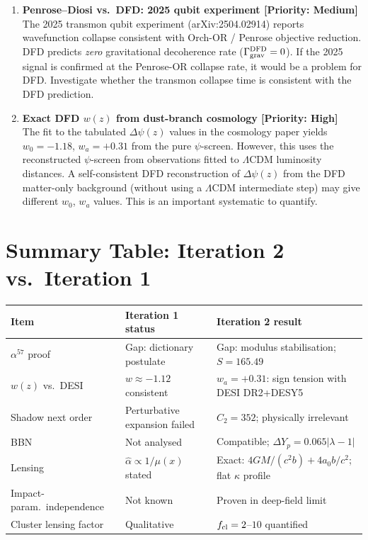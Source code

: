 \documentclass[11pt]{article}
\newcommand{\lambdaone}{|\lambda-1|}
\begin{document}
\begin{enumerate}
\item \textbf{Penrose--Diosi vs.\ DFD: 2025 qubit experiment [Priority: Medium]} \\
The 2025 transmon qubit experiment (arXiv:2504.02914) reports
wavefunction collapse consistent with Orch-OR / Penrose objective
reduction.  DFD predicts \emph{zero} gravitational decoherence rate
($\Gamma_{\rm grav}^{\rm DFD} = 0$).  If the 2025 signal is confirmed
at the Penrose-OR collapse rate, it would be a problem for DFD.
Investigate whether the transmon collapse time is consistent with
the DFD prediction.

\item \textbf{Exact DFD $w(z)$ from dust-branch cosmology [Priority: High]} \\
The fit to the tabulated $\Delta\psi(z)$ values in the cosmology paper
yields $w_0 = -1.18$, $w_a = +0.31$ from the pure $\psi$-screen.
However, this uses the reconstructed $\psi$-screen from observations
fitted to $\Lambda$CDM luminosity distances.  A self-consistent DFD
reconstruction of $\Delta\psi(z)$ from the DFD matter-only background
(without using a $\Lambda$CDM intermediate step) may give different
$w_0$, $w_a$ values.  This is an important systematic to quantify.
\end{enumerate}

\section*{Summary Table: Iteration 2 vs.\ Iteration 1}

\begin{center}
\begin{tabular}{lll}
\toprule
Item & Iteration 1 status & Iteration 2 result \\
\midrule
$\alpha^{57}$ proof & Gap: dictionary postulate & Gap: modulus
stabilisation; $S=165.49$ \\
$w(z)$ vs.\ DESI & $w \approx -1.12$ consistent & $w_a = +0.31$: sign
tension with DESI DR2+DESY5 \\
Shadow next order & Perturbative expansion failed & $C_2 = 352$;
physically irrelevant \\
BBN & Not analysed & Compatible; $\Delta Y_p = 0.065\lambdaone$ \\
Lensing & $\hat\alpha \propto 1/\mu(x)$ stated & Exact: $4GM/(c^2 b)
+ 4a_0 b/c^2$; flat $\kappa$ profile \\
Impact-param.\ independence & Not known & Proven in deep-field limit \\
Cluster lensing factor & Qualitative & $f_{\rm cl} = 2$--$10$ quantified \\
\bottomrule
\end{tabular}
\end{center}
\end{document}
